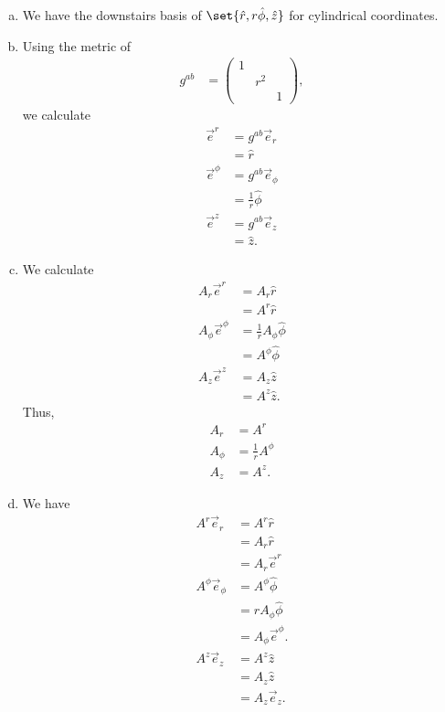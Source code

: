 \documentclass[10pt]{mypackage}
\begin{document}
\begin{solution}[30.6]\hfill
  \begin{enumerate}[(a)]
    \item We have the downstairs basis of $\set{\hat{r},r\hat{\phi},\hat{z}}$ for cylindrical coordinates.
    \item Using the metric of
      \begin{align*}
        g^{ab} &= \begin{pmatrix}1 & & \\ & r^2 & \\ & & 1\end{pmatrix},
      \end{align*}
      we calculate
      \begin{align*}
        \vec{e}^{r} &= g^{ab}\vec{e}_r\\
                    &= \hat{r}\\
        \vec{e}^{\phi} &= g^{ab}\vec{e}_{\phi}\\
                       &= \frac{1}{r}\hat{\phi}\\
        \vec{e}^{z} &= g^{ab}\vec{e}_{z}\\
                    &= \hat{z}.
      \end{align*}
    \item We calculate
      \begin{align*}
        A_{r}\vec{e}^{r} &= A_{r}\hat{r}\\
                         &= A^{r}\hat{r}\\
        A_{\phi}\vec{e}^{\phi} &= \frac{1}{r}A_{\phi}\hat{\phi}\\
                               &= A^{\phi}\hat{\phi}\\
        A_{z}\vec{e}^{z}  &= A_{z}\hat{z}\\
                          &= A^{z}\hat{z}.
      \end{align*}
      Thus,
      \begin{align*}
        A_r &= A^r\\
        A_{\phi} &= \frac{1}{r}A^{\phi}\\
        A_{z} &= A^{z}.
      \end{align*}
    \item We have
      \begin{align*}
        A^r\vec{e}_r &= A^r\hat{r}\\
                     &= A_r\hat{r}\\
                     &= A_r\vec{e}^r\\
        A^{\phi}\vec{e}_{\phi} &= A^{\phi}\hat{\phi}\\
                               &= rA_{\phi}\hat{\phi}\\
                               &= A_{\phi}\vec{e}^{\phi}.\\
        A^z\vec{e}_z &= A^z\hat{z}\\
                     &= A_z\hat{z}\\
                     &= A_z\vec{e}_z.
      \end{align*}
  \end{enumerate}
\end{solution}
\end{document}
